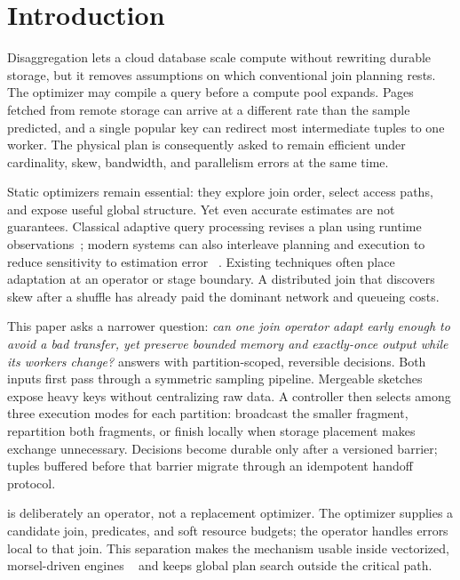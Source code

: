 \section{Introduction}
\label{sec:introduction}

Disaggregation lets a cloud database scale compute without rewriting durable
storage, but it removes assumptions on which conventional join planning rests.
The optimizer may compile a query before a compute pool expands.  Pages fetched
from remote storage can arrive at a different rate than the sample predicted,
and a single popular key can redirect most intermediate tuples to one worker.
The physical plan is consequently asked to remain efficient under cardinality,
skew, bandwidth, and parallelism errors at the same time.

Static optimizers remain essential: they explore join order, select access
paths, and expose useful global structure.  Yet even accurate estimates are not
guarantees.  Classical adaptive query processing revises a plan using runtime
observations~\cite{deshpande2007adaptive}; modern systems can also interleave
planning and execution to reduce sensitivity to estimation error
~\cite{trummer2019skinner}.  Existing techniques often place adaptation at an
operator or stage boundary.  A distributed join that discovers skew after a
shuffle has already paid the dominant network and queueing costs.

This paper asks a narrower question: \emph{can one join operator adapt early
enough to avoid a bad transfer, yet preserve bounded memory and exactly-once
output while its workers change?}  \system{} answers with partition-scoped,
reversible decisions.  Both inputs first pass through a symmetric sampling
pipeline.  Mergeable sketches expose heavy keys without centralizing raw data.
A controller then selects among three execution modes for each partition:
broadcast the smaller fragment, repartition both fragments, or finish locally
when storage placement makes exchange unnecessary.  Decisions become durable
only after a versioned barrier; tuples buffered before that barrier migrate
through an idempotent handoff protocol.

\system{} is deliberately an operator, not a replacement optimizer.  The
optimizer supplies a candidate join, predicates, and soft resource budgets;
the operator handles errors local to that join.  This separation makes the
mechanism usable inside vectorized, morsel-driven engines
~\cite{leis2014morsel} and keeps global plan search outside the critical path.

